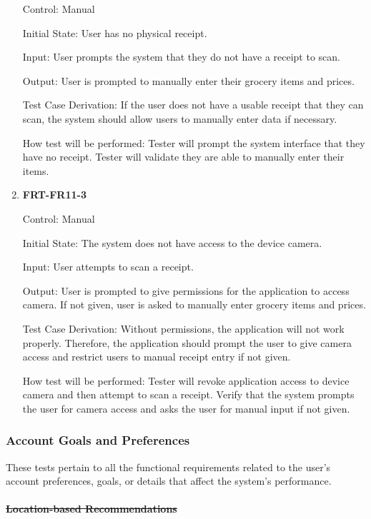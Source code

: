 \documentclass[12pt, titlepage]{article}
\begin{document}
\begin{enumerate}
Control: Manual
          
Initial State: User has no physical receipt.

Input: User prompts the system that they do not have a receipt to scan.
          
Output: User is prompted to manually enter their grocery items and prices.

Test Case Derivation: If the user does not have a usable receipt that they can scan, the system should allow users to manually
enter data if necessary.
          
How test will be performed: Tester will prompt the system interface that they have no receipt. Tester will validate they are able to manually enter their items.

\item{\textbf{FRT-FR11-3}}

Control: Manual
          
Initial State: The system does not have access to the device camera.

Input: User attempts to scan a receipt.
          
Output: User is prompted to give permissions for the application to access camera. If not given, user is asked to manually enter grocery items and prices.

Test Case Derivation: Without permissions, the application will not work properly. Therefore, the application should prompt the user to give
camera access and restrict users to manual receipt entry if not given.
          
How test will be performed: Tester will revoke application access to device camera and then attempt to scan a receipt. Verify that the system prompts the user for camera access and asks the user for manual input if not given.

\end{enumerate}

\subsubsection{Account Goals and Preferences}

These tests pertain to all the functional requirements related to the user's account preferences, goals, or details that affect the system's performance.

\paragraph{\sout{Location-based Recommendations}}
\end{document}
